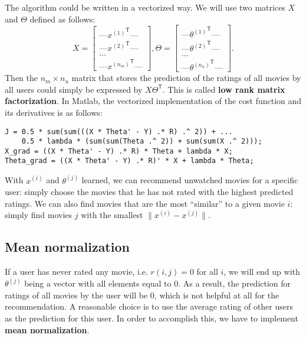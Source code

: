 The algorithm could be written in a vectorized way. We will use two matrices $X$ and $\Theta$ defined as follows:
\begin{equation}
X = \begin{bmatrix}
\text{---}{x^{(1)}}^{\mathsf T}\text{---}\\
\text{---}{x^{(2)}}^{\mathsf T}\text{---}\\
\dots\\
\text{---}{x^{(n_m)}}^{\mathsf T}\text{---}
\end{bmatrix}, 
\Theta = \begin{bmatrix}
\text{---}{\theta^{(1)}}^{\mathsf T}\text{---}\\
\text{---}{\theta^{(2)}}^{\mathsf T}\text{---}\\
\dots\\
\text{---}{\theta^{(n_u)}}^{\mathsf T}\text{---}
\end{bmatrix}.
\end{equation}
Then the $n_m\times n_u$ matrix that stores the prediction of the ratings of all movies by all users could simply be expressed by $X\Theta^{\mathsf T}$. This is called {\bf low rank matrix factorization}. In Matlab, the vectorized implementation of the cost function and its derivatives is as follows:
\begin{lstlisting}
J = 0.5 * sum(sum(((X * Theta' - Y) .* R) .^ 2)) + ...
    0.5 * lambda * (sum(sum(Theta .^ 2)) + sum(sum(X .^ 2)));
X_grad = ((X * Theta' - Y) .* R) * Theta + lambda * X;
Theta_grad = ((X * Theta' - Y) .* R)' * X + lambda * Theta;
\end{lstlisting}

With $x^{(i)}$ and $\theta^{(j)}$ learned, we can recommend unwatched movies for a specific user: simply choose the movies that he has not rated with the highest predicted ratings. We can also find movies that are the most ``similar'' to a given movie $i$: simply find movies $j$ with the smallest $\lVert x^{(i)} - x^{(j)}\rVert$.

\subsection{Mean normalization}
If a user has never rated any movie, i.e. $r(i,j) = 0$ for all $i$, we will end up with $\theta^{(j)}$ being a vector with all elements equal to 0. As a result, the prediction for ratings of all movies by the user will be 0, which is not helpful at all for the recommendation. A reasonable choice is to use the average rating of other users as the prediction for this user. In order to accomplish this, we have to implement {\bf mean normalization}.


